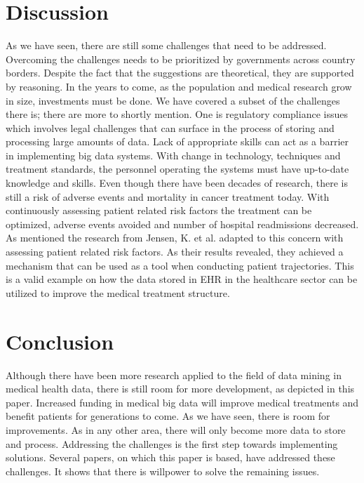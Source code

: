 \section{Discussion}
As we have seen, there are still some challenges that need to be addressed. Overcoming the challenges needs to be prioritized by governments across country borders. Despite the fact that the suggestions are theoretical, they are supported by reasoning. In the years to come, as the population and medical research grow in size, investments must be done. We have covered a subset of the challenges there is; there are more to shortly mention. One is regulatory compliance issues\cite{kek} which involves legal challenges that can surface in the process of storing and processing large amounts of data. Lack of appropriate skills can act as a barrier in implementing big data systems\cite{kek}. With change in technology, techniques and treatment standards, the personnel operating the systems must have up-to-date knowledge and skills.
Even though there have been decades of research, there is still a risk of adverse events and mortality in cancer treatment today. With continuously assessing patient related risk factors the treatment can be optimized, adverse events avoided and number of hospital readmissions decreased. As mentioned the research  from Jensen, K. et al. adapted to this concern with assessing patient related risk factors. As their results revealed, they achieved a mechanism that can be used as a tool when conducting patient trajectories. This is a valid example on how the data stored in EHR in the healthcare sector can be utilized to improve the medical treatment structure. 

 
\section{Conclusion}
Although there have been more research applied to the field of data mining in medical health data, there is still room for more development, as depicted in this paper. Increased funding in medical big data will improve medical treatments and benefit patients for generations to come. As we have seen, there is room for improvements. As in any other area, there will only become more data to store and process. Addressing the challenges is the first step towards implementing solutions. Several papers, on which this paper is based, have addressed these challenges. It shows that there is willpower to solve the remaining issues. 











